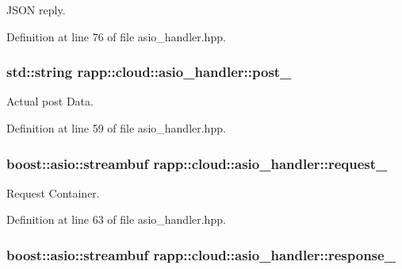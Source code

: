 J\-S\-O\-N reply. 



Definition at line 76 of file asio\-\_\-handler.\-hpp.

\hypertarget{classrapp_1_1cloud_1_1asio__handler_af7ee580670c0758a7d5b064b196f63dd}{
\subsubsection[{post\-\_\-}]{\setlength{\rightskip}{0pt plus 5cm}std\-::string rapp\-::cloud\-::asio\-\_\-handler\-::post\-\_\-\hspace{0.3cm}{\ttfamily [protected]}}}\label{classrapp_1_1cloud_1_1asio__handler_af7ee580670c0758a7d5b064b196f63dd}


Actual post Data. 



Definition at line 59 of file asio\-\_\-handler.\-hpp.

\hypertarget{classrapp_1_1cloud_1_1asio__handler_a0af7166690e952031a80be61d77faebb}{
\subsubsection[{request\-\_\-}]{\setlength{\rightskip}{0pt plus 5cm}boost\-::asio\-::streambuf rapp\-::cloud\-::asio\-\_\-handler\-::request\-\_\-\hspace{0.3cm}{\ttfamily [protected]}}}\label{classrapp_1_1cloud_1_1asio__handler_a0af7166690e952031a80be61d77faebb}


Request Container. 



Definition at line 63 of file asio\-\_\-handler.\-hpp.

\hypertarget{classrapp_1_1cloud_1_1asio__handler_a82f38d6e607030e2df7952cc772ce1cd}{
\subsubsection[{response\-\_\-}]{\setlength{\rightskip}{0pt plus 5cm}boost\-::asio\-::streambuf rapp\-::cloud\-::asio\-\_\-handler\-::response\-\_\-\hspace{0.3cm}{\ttfamily [protected]}}}\label{classrapp_1_1cloud_1_1asio__handler_a82f38d6e607030e2df7952cc772ce1cd}



